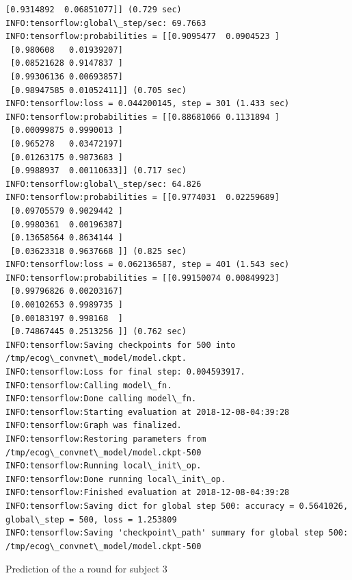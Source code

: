\documentclass[11pt]{article}
\begin{document}
\begin{Verbatim}[commandchars=\\\{\}]
 [0.9314892  0.06851077]] (0.729 sec)
INFO:tensorflow:global\_step/sec: 69.7663
INFO:tensorflow:probabilities = [[0.9095477  0.0904523 ]
 [0.980608   0.01939207]
 [0.08521628 0.9147837 ]
 [0.99306136 0.00693857]
 [0.98947585 0.01052411]] (0.705 sec)
INFO:tensorflow:loss = 0.044200145, step = 301 (1.433 sec)
INFO:tensorflow:probabilities = [[0.88681066 0.1131894 ]
 [0.00099875 0.9990013 ]
 [0.965278   0.03472197]
 [0.01263175 0.9873683 ]
 [0.9988937  0.00110633]] (0.717 sec)
INFO:tensorflow:global\_step/sec: 64.826
INFO:tensorflow:probabilities = [[0.9774031  0.02259689]
 [0.09705579 0.9029442 ]
 [0.9980361  0.00196387]
 [0.13658564 0.8634144 ]
 [0.03623318 0.9637668 ]] (0.825 sec)
INFO:tensorflow:loss = 0.062136587, step = 401 (1.543 sec)
INFO:tensorflow:probabilities = [[0.99150074 0.00849923]
 [0.99796826 0.00203167]
 [0.00102653 0.9989735 ]
 [0.00183197 0.998168  ]
 [0.74867445 0.2513256 ]] (0.762 sec)
INFO:tensorflow:Saving checkpoints for 500 into /tmp/ecog\_convnet\_model/model.ckpt.
INFO:tensorflow:Loss for final step: 0.004593917.
INFO:tensorflow:Calling model\_fn.
INFO:tensorflow:Done calling model\_fn.
INFO:tensorflow:Starting evaluation at 2018-12-08-04:39:28
INFO:tensorflow:Graph was finalized.
INFO:tensorflow:Restoring parameters from /tmp/ecog\_convnet\_model/model.ckpt-500
INFO:tensorflow:Running local\_init\_op.
INFO:tensorflow:Done running local\_init\_op.
INFO:tensorflow:Finished evaluation at 2018-12-08-04:39:28
INFO:tensorflow:Saving dict for global step 500: accuracy = 0.5641026, global\_step = 500, loss = 1.253809
INFO:tensorflow:Saving 'checkpoint\_path' summary for global step 500: /tmp/ecog\_convnet\_model/model.ckpt-500

    \end{Verbatim}

    Prediction of the a round for subject 3
\end{document}
